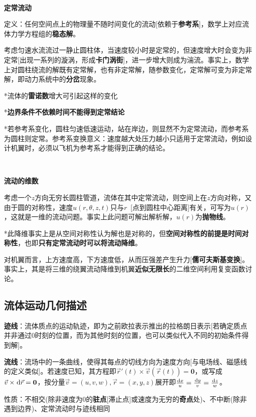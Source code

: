 \documentclass[a4paper,UTF8,fontset=windows]{ctexart}
\newcommand*{\dr}{\hspace{0.07em}\mathrm{d}}
\begin{document}
\

\textbf{定常流动}

定义：任何空间点上的物理量不随时间变化的流动[依赖于\textbf{参考系}]，数学上对应流体力学方程组的\textbf{稳态解}。

考虑匀速水流流过一静止圆柱体，当速度较小时是定常的，但速度增大时会变为非定常[出现一系列的漩涡，形成\textbf{卡门涡街}]，进一步增大则成为湍流。事实上，数学上对圆柱绕流的解既有定常解，也有非定常解，随参数变化，定常解可变为非定常解，即动力系统中的\textbf{分岔}现象。

*流体的\textbf{雷诺数}增大可引起这样的变化

*\textbf{边界条件不依赖时间不能得到定常结论}

*若参考系变化，圆柱匀速低速运动，站在岸边，则显然不为定常流动，而参考系为圆柱则定常。参考系变换意义：速度越大处压力越小只适用于定常流动，例如设计机翼时，必须以飞机为参考系才能得到正确的结论。

\

\textbf{流动的维数}

考虑一个$z$方向无穷长圆柱管道，流体在其中定常流动，则空间上在$z$方向对称，又由于圆的对称性，速度$u(r,\theta,z,t)$只与$r$\ [点到圆柱中心距离]有关，可写为$u(r)$，这就是一维的流动问题。事实上此问题可解出解析解，$u(r)$为\textbf{抛物线}。

*此降维事实上是从空间对称性认为解也是对称的，但\textbf{空间对称性的前提是时间对称性}，也即\textbf{只有定常流动时可以将流动降维}。

对机翼而言，上方速度高，下方速度低，从而压强差产生升力[\textbf{儒可夫斯基变换}]。事实上，其是将三维的绕翼流动降维到机翼\textbf{近似无限长}的二维空间利用复变函数讨论。

\subsection{流体运动几何描述}
\textbf{迹线}：流体质点的运动轨迹，即为之前欧拉表示推出的拉格朗日表示[若确定质点并非通过0时刻的位置，而为其他时刻的位置，也可以类似代入不同的初始条件得到解]。

\textbf{流线}：流场中的一条曲线，使得其每点的切线方向为速度方向[与电场线、磁感线的定义类似]。若速度已知，其方程即$\vec{r}'(t)\times\vec{v}(\vec{r}(t))=\mathbf{0}$，或写成$\vec{v}\times\dr\vec{r}=\mathbf{0}$，按分量$\vec{v}=(u,v,w),\vec{r}=(x,y,z)$展开即$\frac{\dr x}{u}=\frac{\dr y}{v}=\frac{\dr z}{w}$。

性质：不相交(除非速度为0的\textbf{驻点}[滞止点]或速度为无穷的\textbf{奇点}处)、不中断(除非遇到边界)、定常流动时与迹线相同
\end{document}
